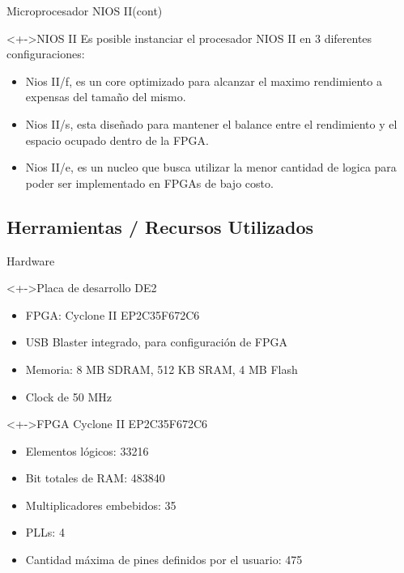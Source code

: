 \documentclass[xcolor=dvipsnames]{beamer}
\begin{document}
\begin{frame}{Microprocesador NIOS II(cont)}
\center
   \begin{block}<+->{NIOS II}
	Es posible instanciar el procesador NIOS II en 3 diferentes configuraciones:	
	

    \begin{itemize}
	\scriptsize
     	\item Nios II/f, es un core optimizado para alcanzar el maximo rendimiento a expensas del tamaño del mismo.
	\item Nios II/s, esta diseñado para mantener el balance entre el rendimiento y el espacio ocupado dentro de la FPGA.
	\item Nios II/e, es un nucleo que busca utilizar la menor cantidad de logica para poder ser implementado en FPGAs de bajo costo.
    \end{itemize}
  \end{block}
\end{frame}

\subsection{Herramientas / Recursos Utilizados}
\begin{frame}{Hardware}
  \begin{block}<+->{Placa de desarrollo DE2} 	
    \begin{itemize}
      \scriptsize
     	\item FPGA: Cyclone II EP2C35F672C6
	\item USB Blaster integrado, para configuración de FPGA
	\item Memoria: 8 MB SDRAM, 512 KB SRAM, 4 MB Flash
	\item Clock de 50 MHz
     \end{itemize}
  \end{block}

  \begin{block}<+->{FPGA Cyclone II EP2C35F672C6} 	
    \begin{itemize}
      \scriptsize
     	\item Elementos lógicos: 33216
	\item Bit totales de RAM: 483840
	\item Multiplicadores embebidos: 35
	\item PLLs: 4
	\item Cantidad máxima de pines definidos por el usuario: 475
     \end{itemize}
  \end{block}
\end{frame}
\end{document}
